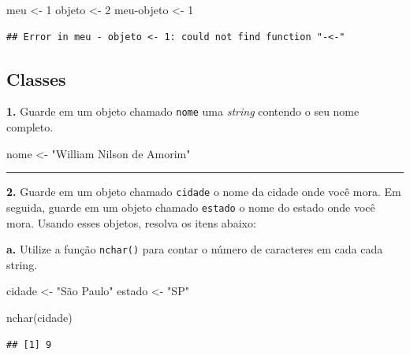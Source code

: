 \documentclass[
]{book}
\newenvironment{Shaded}{\begin{snugshade}}{\end{snugshade}}
\newcommand{\DecValTok}[1]{\textcolor[rgb]{0.00,0.00,0.81}{#1}}
\newcommand{\FunctionTok}[1]{\textcolor[rgb]{0.00,0.00,0.00}{#1}}
\newcommand{\NormalTok}[1]{#1}
\newcommand{\OtherTok}[1]{\textcolor[rgb]{0.56,0.35,0.01}{#1}}
\newcommand{\SpecialCharTok}[1]{\textcolor[rgb]{0.00,0.00,0.00}{#1}}
\newcommand{\StringTok}[1]{\textcolor[rgb]{0.31,0.60,0.02}{#1}}
\begin{document}
\begin{Shaded}
\begin{Highlighting}[]
\NormalTok{meu }\OtherTok{\textless{}{-}} \DecValTok{1}
\NormalTok{objeto }\OtherTok{\textless{}{-}} \DecValTok{2}
\NormalTok{meu}\SpecialCharTok{{-}}\NormalTok{objeto }\OtherTok{\textless{}{-}} \DecValTok{1}
\end{Highlighting}
\end{Shaded}

\begin{verbatim}
## Error in meu - objeto <- 1: could not find function "-<-"
\end{verbatim}

\hypertarget{classes-1}{%
\subsection*{Classes}\label{classes-1}}

\textbf{1.} Guarde em um objeto chamado \texttt{nome} uma \emph{string} contendo o seu nome completo.

\begin{Shaded}
\begin{Highlighting}[]
\NormalTok{nome }\OtherTok{\textless{}{-}} \StringTok{"William Nilson de Amorim"}
\end{Highlighting}
\end{Shaded}

\begin{center}\rule{0.5\linewidth}{0.5pt}\end{center}

\textbf{2.} Guarde em um objeto chamado \texttt{cidade} o nome da cidade onde você mora. Em seguida, guarde em um objeto chamado \texttt{estado} o nome do estado onde você mora. Usando esses objetos, resolva os itens abaixo:

\textbf{a.} Utilize a função \texttt{nchar()} para contar o número de caracteres em cada cada string.

\begin{Shaded}
\begin{Highlighting}[]
\NormalTok{cidade }\OtherTok{\textless{}{-}} \StringTok{"São Paulo"}
\NormalTok{estado }\OtherTok{\textless{}{-}} \StringTok{"SP"}

\FunctionTok{nchar}\NormalTok{(cidade)}
\end{Highlighting}
\end{Shaded}

\begin{verbatim}
## [1] 9
\end{verbatim}
\end{document}
